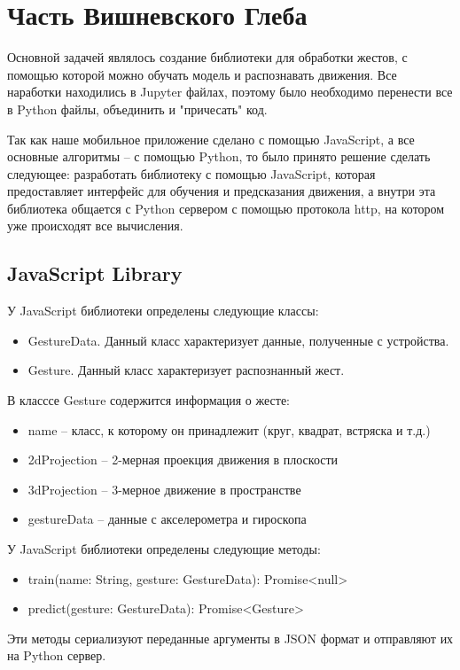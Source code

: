 \section{Часть Вишневского Глеба}

Основной задачей являлось создание библиотеки для обработки жестов, с помощью которой можно обучать модель и распознавать движения. Все наработки находились в Jupyter файлах, поэтому было необходимо перенести все в Python файлы, объединить и "причесать" код. \newline

Так как наше мобильное приложение сделано с помощью JavaScript, а все основные алгоритмы – с помощью Python, то было принято решение сделать следующее: разработать библиотеку с помощью JavaScript, которая предоставляет интерфейс для обучения и предсказания движения, а внутри эта библиотека общается с Python сервером с помощью протокола http, на котором уже происходят все вычисления.

\subsection{JavaScript Library}
У JavaScript библиотеки определены следующие классы:
\begin{itemize}
  \item GestureData. Данный класс характеризует данные, полученные с устройства.
  \item Gesture. Данный класс характеризует распознанный жест.
\end{itemize}
В класссе Gesture содержится информация о жесте:
\begin{itemize}
  \item name -- класс, к которому он принадлежит (круг, квадрат, встряска и т.д.)
  \item 2dProjection -- 2-мерная проекция движения в плоскости
  \item 3dProjection -- 3-мерное движение в пространстве
  \item gestureData -- данные с акселерометра и гироскопа
\end{itemize}

У JavaScript библиотеки определены следующие методы:
\begin{itemize}
  \item train(name: String, gesture: GestureData): Promise<null> {} 
  \item predict(gesture: GestureData): Promise<Gesture> {}
\end{itemize}
Эти методы сериализуют переданные аргументы в JSON формат и отправляют их на Python сервер.


